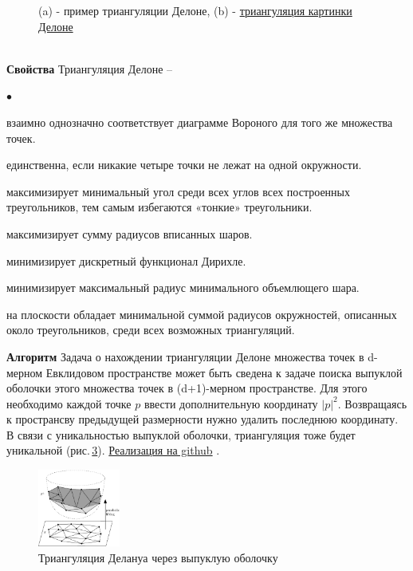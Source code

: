 \documentclass[11pt,a4paper]{extarticle}
\newenvironment{compactlist}{
\begin{list}{{$\bullet$}}{
\setlength\partopsep{0pt}
\setlength\parskip{0pt}
\setlength\parsep{0pt}
\setlength\topsep{0pt}
\setlength\itemsep{0pt}
}}{
\end{list}
}
\begin{document}
\begin{figure}[ht]
\begin{subfigure}[ht]{3in}
						\caption{}	
						\label{msu_delone}
					\end{subfigure}
					\caption{(a) - пример триангуляции Делоне, (b) - \href{https://github.com/snorpey/triangulate-image}{триангуляция картинки Делоне}}	
				\end{figure}\\
				\textbf{Свойства}\:\: Триангуляция Делоне -- 
				\begin{compactlist}
					\item взаимно однозначно соответствует диаграмме Вороного для того же множества точек.
					\item единственна, если никакие четыре точки не лежат на одной окружности.
					\item максимизирует минимальный угол среди всех углов всех построенных треугольников, тем самым избегаются «тонкие» треугольники.
					\item максимизирует сумму радиусов вписанных шаров.
					\item минимизирует дискретный функционал Дирихле.
					\item минимизирует максимальный радиус минимального объемлющего шара.
					\item на плоскости обладает минимальной суммой радиусов окружностей, описанных около треугольников, среди всех возможных триангуляций.\\
				\end{compactlist}
				\textbf{Алгоритм}\:\: Задача о нахождении триангуляции Делоне множества точек в d-мерном Евклидовом пространстве может быть сведена к задаче поиска выпуклой оболочки этого множества точек в (d+1)-мерном пространстве.
				Для этого необходимо каждой точке $p$ ввести дополнительную координату $|p|^2$.
				Возвращаясь к пространсву предыдущей размерности нужно удалить последнюю координату. 
				В связи с уникальностью выпуклой оболочки, триангуляция тоже будет уникальной (рис.\,\ref{lift_delone}).
				\href{https://github.com/jmlien/cshape2d}{Реализация на github} \cite{cshape2d}.
				\begin{figure}[ht]
					\centering
					\includegraphics[width=0.24\textwidth]{lift_delone}
					\caption{Триангуляция Делануа через выпуклую оболочку}
					\label{lift_delone}
				\end{figure}
			
\end{document}
